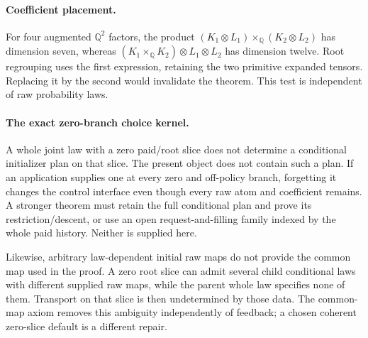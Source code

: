 \documentclass[11pt]{article}
\begin{document}
\paragraph{Coefficient placement.}
For four augmented $\mathbb Q^2$ factors, the product
$(K_1\otimes L_1)\times_{\mathbb Q}(K_2\otimes L_2)$ has dimension seven, whereas $(K_1\times_{\mathbb Q}K_2)\otimes L_1\otimes L_2$ has dimension twelve. Root regrouping uses the first expression, retaining the two primitive expanded tensors. Replacing it by the second would invalidate the theorem. This test is independent of raw probability laws.

\paragraph{The exact zero-branch choice kernel.}
A whole joint law with a zero paid/root slice does not determine a conditional initializer plan on that slice. The present object does not contain such a plan. If an application supplies one at every zero and off-policy branch, forgetting it changes the control interface even though every raw atom and coefficient remains. A stronger theorem must retain the full conditional plan and prove its restriction/descent, or use an open request-and-filling family indexed by the whole paid history. Neither is supplied here.

Likewise, arbitrary law-dependent initial raw maps do not provide the common map used in the proof. A zero root slice can admit several child conditional laws with different supplied raw maps, while the parent whole law specifies none of them. Transport on that slice is then undetermined by those data. The common-map axiom removes this ambiguity independently of feedback; a chosen coherent zero-slice default is a different repair.
\end{document}
